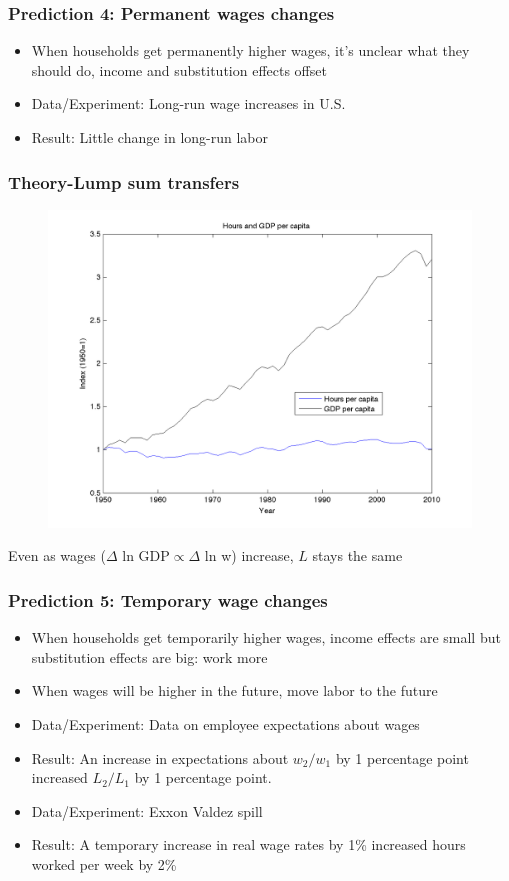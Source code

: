 \documentclass{beamer}
\begin{document}
\begin{frame}
\frametitle{Prediction 4: Permanent wages changes}
\begin{itemize}
\item When households get permanently higher wages, it's unclear what they should do, income and substitution effects offset  
\bigskip
\item Data/Experiment:  Long-run wage increases in U.S.
\bigskip
\item Result:  Little change in long-run labor
\end{itemize}
\end{frame}

\begin{frame}
\frametitle{Theory-Lump sum transfers }
\begin{figure}
\centering
\includegraphics[scale=0.5]{Figure10.png}
\end{figure}
Even as wages ($\Delta$ ln GDP$\propto \Delta$ ln w) increase, $L$ stays the same
\end{frame}



\begin{frame}
\frametitle{Prediction 5: Temporary wage changes}
\begin{itemize}
\item When households get temporarily higher wages, income effects are small but substitution effects are big: work more
\item When wages will be higher in the future, move labor to the future
\bigskip
\item Data/Experiment:  Data on employee expectations about wages
\bigskip
\item Result:  An increase in expectations about $w_2/w_1$ by 1 percentage point increased $L_2/L_1$ by 1 percentage point.
\bigskip
\item Data/Experiment:  Exxon Valdez spill
\bigskip
\item Result:  A temporary increase in real wage rates by 1\% increased hours worked per week by 2\%
\end{itemize}
\end{frame}
\end{document}
